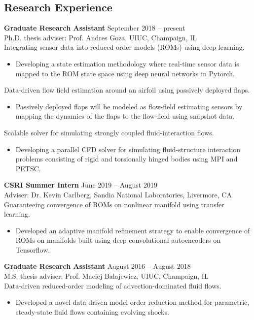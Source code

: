 \documentclass[margin]{res}
\begin{document}
\begin{resume}
\section{\large Research Experience}
{\bf Graduate Research Assistant} \hfill September 2018 -- present\\
Ph.D. thesis adviser: Prof. Andres Goza, UIUC, Champaign, IL \\
%
Integrating sensor data into reduced-order models (ROMs) using deep learning.
\begin{itemize}
\item Developing a state estimation methodology where real-time sensor data is mapped to the ROM state space using deep neural networks in Pytorch.
\end{itemize}

Data-driven flow field estimation around an airfoil using passively deployed flaps.
\begin{itemize}
\item Passively deployed flaps will be modeled as flow-field estimating sensors by mapping the dynamics of the flaps to the flow-field using snapshot data.
\end{itemize}

Scalable solver for simulating strongly coupled fluid-interaction flows.
\begin{itemize}
\item Developing a parallel CFD solver for simulating fluid-structure interaction problems consisting of rigid and torsionally hinged bodies using MPI and PETSC.
\end{itemize}

{\bf CSRI Summer Intern} \hfill June 2019 -- August 2019\\
Adviser: Dr. Kevin Carlberg, Sandia National Laboratories, Livermore, CA \\
%
Guaranteeing convergence of ROMs on nonlinear manifold using transfer learning.
\begin{itemize}
\item Developed an adaptive manifold refinement strategy to enable convergence of ROMs on manifolds built using deep convolutional autoencoders on Tensorflow.
\end{itemize}

{\bf Graduate Research Assistant} \hfill August 2016 -- August 2018\\
M.S. thesis adviser: Prof. Maciej Balajewicz, UIUC, Champaign, IL \\
Data-driven reduced-order modeling of advection-dominated fluid flows.
\begin{itemize}
\item Developed a novel data-driven model order reduction method for parametric, steady-state fluid flows containing evolving shocks.
\end{itemize}



\end{resume}
\end{document}
